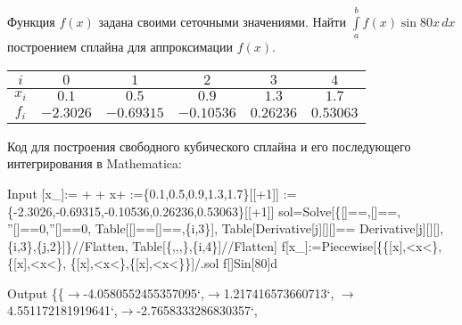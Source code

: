 \documentclass[a4paper]{article}
\begin{document}
\begin{hiProb}[9.13б]
	Функция $f(x)$ задана своими сеточными значениями.
	Найти $\int\limits_{a}^{b} f(x) \sin 80x \, dx $ 
	построением сплайна для аппроксимации $f(x)$.
	\begin{table}[htpb]
		\centering
		\label{tab:913}
		\begin{tabular}{|c|c|c|c|c|c|}\hline
		 $i$& $0$ & $1$ &$2$  &$3$  &$4$ \\ \hline 
		 $x_{i}$& $0.1$  & $0.5$ & $0.9$ &$1.3$  &$1.7$ \\ \hline 
		 $f_{i}$ & $-2.3026$ & $-0.69315$ & $-0.10536$ & $0.26236$ & $0.53063$ \\ \hline 
		\end{tabular}
	\end{table}
\end{hiProb}
\begin{sol}
Код для построения свободного кубического сплайна и его последующего интегрирования в Mathematica:
\begin{mmaCell}[morepattern={i_, x_, x},morefunctionlocal={i, j},moredefined={f, sol}]{Input}
  [x_]:= + + x+
  :=\{0.1,0.5,0.9,1.3,1.7\}[[+1]]
  :=\{-2.3026,-0.69315,-0.10536,0.26236,0.53063\}[[+1]]
  sol=Solve[\{[]==,[]==, ''[]==0,''[]==0,
  Table[[]==[]==,\{i,3\}],
  Table[Derivative[j][][]==
  Derivative[j][][],\{i,3\},\{j,2\}]\}//Flatten,
  Table[\{,,,\},\{i,4\}]//Flatten]
  f[x_]:=Piecewise[\{\{[x],<x<\},\{[x],<x<\},
  \{[x],<x<\},\{[x],<x<\}\}]/.sol
  f[]Sin[80]d
\end{mmaCell}
\begin{mmaCell}[]{Output}
  \{\{\(\to\)-4.0580552455357095`,\(\to\)1.217416573660713`,
  \(\to\)4.551172181919641`,\(\to\)-2.7658333286830357`,

\end{mmaCell}
\end{sol}
\end{document}
